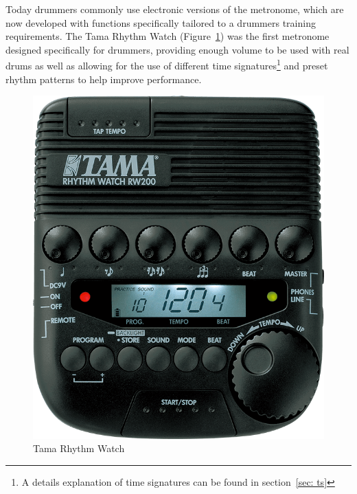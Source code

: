 \documentclass[a4paper, 11pt]{article}
\begin{document}
Today drummers commonly use electronic versions of the metronome, which are now developed with functions specifically tailored to a drummers training requirements. The Tama Rhythm Watch (Figure~\ref{fig: RW200}) was the first metronome designed specifically for drummers, providing enough volume to be used with real drums as well as allowing for the use of different time signatures\footnote{A details explanation of time signatures can be found in section~\ref{sec: ts}} and preset rhythm patterns to help improve performance.\par

\begin{figure}[h]
	\centering
	\includegraphics[scale=0.2]{RW200}
	\caption{Tama Rhythm Watch \cite{tama}}
	\label{fig: RW200}
\end{figure}
\end{document}
